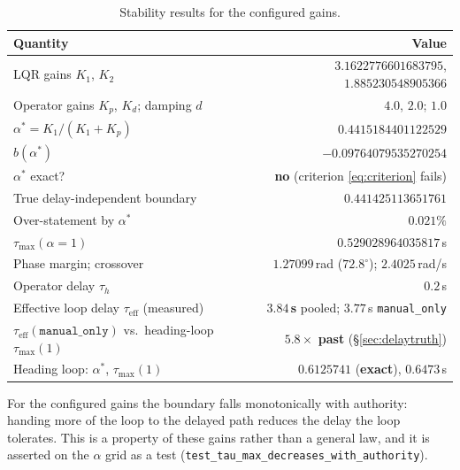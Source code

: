 \documentclass[11pt,a4paper]{article}
\newcommand{\vmanual}{\texttt{manual\_only}}
\newcommand{\astar}{\alpha^{*}}
\theoremstyle{plain}
\theoremstyle{definition}
\begin{document}
\begin{table}[htbp]
\centering
\small
\begin{tabular}{@{}lr@{}}
\toprule
Quantity & Value \\
\midrule
LQR gains $K_1$, $K_2$ & $3.1622776601683795$, $1.885230548905366$ \\
Operator gains $K_p$, $K_d$; damping $d$ & $4.0$, $2.0$; $1.0$ \\
$\astar = K_1/(K_1+K_p)$ & $0.4415184401122529$ \\
$b(\astar)$ & $-0.09764079535270254$ \\
$\astar$ exact? & \textbf{no} (criterion \eqref{eq:criterion} fails) \\
True delay-independent boundary & $0.441425113651761$ \\
Over-statement by $\astar$ & $0.021\%$ \\
$\tau_{\max}(\alpha = 1)$ & $0.529028964035817$\,s \\
Phase margin; crossover & $1.27099$\,rad ($72.8^\circ$); $2.4025$\,rad/s \\
Operator delay $\tau_h$ & $0.2$\,s \\
Effective loop delay $\tau_{\mathrm{eff}}$ (measured) & $\mathbf{3.84}$\,\textbf{s} pooled; $3.77$\,s \vmanual{} \\
$\tau_{\mathrm{eff}}(\vmanual{})$ vs.\ heading-loop $\tau_{\max}(1)$ & $\mathbf{5.8\times}$ \textbf{past} (\S\ref{sec:delaytruth}) \\
Heading loop: $\astar$, $\tau_{\max}(1)$ & $0.6125741$ (\textbf{exact}), $0.6473$\,s \\
\bottomrule
\end{tabular}
\caption{Stability results for the configured gains.}
\label{tab:stability}
\end{table}

For the configured gains the boundary falls monotonically with
authority: handing more of the loop to the delayed path reduces the
delay the loop tolerates. This is a property of these gains rather than a
general law, and it is asserted on the $\alpha$ grid as a test
(\texttt{test\_tau\_max\_decreases\_with\_authority}).
\end{document}

